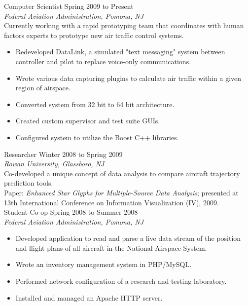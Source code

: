 \documentclass[10pt]{article}
\begin{document}
{\begin{minipage}[t]{0.52\textwidth}

	{\large Computer Scientist} \hfill Spring 2009 to Present\\
	\emph{Federal Aviation Administration, Pomona, NJ}\\[5pt]
	\normalsize{Currently working with a rapid prototyping team that coordinates with human factors experts to prototype new air traffic control systems.}
	\begin{itemize}  \itemsep -2pt \normalsize
      \item Redeveloped DataLink, a simulated "text messaging" system between controller and pilot to replace voice-only communications.
      \item Wrote various data capturing plugins to calculate air traffic within a given region of airspace. 
      \item Converted system from 32 bit to 64 bit architecture.
      \item Created custom supervisor and test suite GUIs.
      \item Configured system to utilize the Boost C++ libraries.
    \end{itemize}
	
	{\large Researcher} \hfill Winter 2008 to Spring 2009\\
	\emph{Rowan University, Glassboro, NJ}\\[5pt]
	\normalsize{Co-developed a unique concept of data analysis to compare aircraft trajectory prediction tools. \\
	            Paper: \emph{Enhanced Star Glyphs for Multiple-Source Data Analysis}; presented at 13th International Conference on Information Visualization (IV), 2009.}\\
	
	
	{\large Student Co-op} \hfill Spring 2008 to Summer 2008\\
	\emph{Federal Aviation Administration, Pomona, NJ}
	  \begin{itemize}  \itemsep -2pt \normalsize
      \item Developed application to read and parse a live data stream
            of the position and flight plans of all aircraft in the National Airspace System.
      \item Wrote an inventory management system in PHP/MySQL.
      \item Performed network configuration of a research and testing laboratory.
      \item Installed and managed an Apache HTTP server.
	\end{itemize}
	

\end{minipage}}
\end{document}
